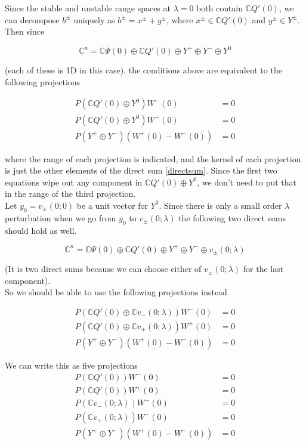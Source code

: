 \documentclass[12pt]{article}
\def\C{{\mathbb C}}
\begin{document}
\begin{enumerate}
Since the stable and unstable range spaces at $\lambda = 0$ both contain $\C Q'(0)$, we can decompose $b^\pm$ uniquely as $b^\pm = x^\pm + y^\pm$, where $x^\pm \in \C Q'(0)$ and $y^\pm \in Y^\pm$. Then since

\begin{equation}\label{directsum}
\C^n = \C\Psi(0) \oplus \C Q'(0) \oplus Y^+ \oplus Y^- \oplus Y^0
\end{equation}

(each of these is 1D in this case), the conditions above are equivalent to the following projections

\begin{align*}
P(\C Q'(0) \oplus Y^0 )W^-(0) &= 0 \\
P(\C Q'(0) \oplus Y^0 )W^+(0) &= 0 \\
P(Y^+ \oplus Y^-) (W^+(0) - W^-(0) ) &= 0
\end{align*}

where the range of each projection is indicated, and the kernel of each projection is just the other elements of the direct sum \eqref{directsum}. Since the first two equations wipe out any component in $\C Q'(0) \oplus Y^0$, we don't need to put that in the range of the third projection. \\

Let $y_0 = v_\pm(0; 0)$ be a unit vector for $Y^0$. Since there is only a small order $\lambda$ perturbation when we go from $y_0$ to $v_\pm(0; \lambda)$ the following two direct sums should hold as well.

\begin{equation}\label{directsum2}
\C^n = \C\Psi(0) \oplus \C Q'(0) \oplus Y^+ \oplus Y^- \oplus v_\pm(0; \lambda)
\end{equation}

(It is two direct sums because we can choose either of $v_\pm(0; \lambda)$ for the last component).\\

So we should be able to use the following projections instead

\begin{align*}
P(\C Q'(0) \oplus \C v_-(0; \lambda) )W^-(0) &= 0 \\
P(\C Q'(0) \oplus \C v_+(0; \lambda) )W^+(0) &= 0 \\
P(Y^+ \oplus Y^-) (W^+(0) - W^-(0) ) &= 0
\end{align*}

We can write this as five projections
\begin{align*}
P(\C Q'(0) )W^-(0) &= 0 \\
P(\C Q'(0) )W^+(0) &= 0 \\
P(\C v_-(0; \lambda))W^-(0) &= 0 \\
P(\C v_+(0; \lambda))W^+(0) &= 0 \\
P(Y^+ \oplus Y^-) (W^+(0) - W^-(0) ) &= 0
\end{align*}


\end{enumerate}
\end{document}
